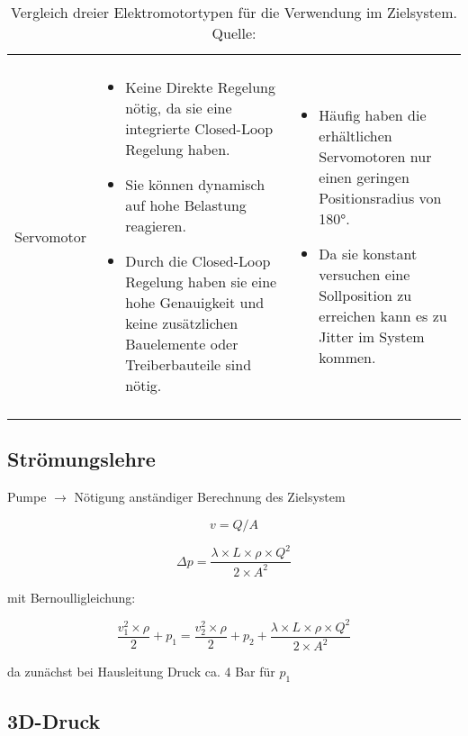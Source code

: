 \begin{longtable}{ p{}|p{}|p{} }
\begin{itemize}
    \end{itemize}
    \\
    Servomotor &
    \begin{itemize}
        \item Keine Direkte Regelung nötig, da sie eine integrierte Closed-Loop Regelung haben.
        \item Sie können dynamisch auf hohe Belastung reagieren.
        \item Durch die Closed-Loop Regelung haben sie eine hohe Genauigkeit und keine zusätzlichen Bauelemente oder Treiberbauteile sind nötig.
    \end{itemize}
    &
    \begin{itemize}
        \item Häufig haben die erhältlichen Servomotoren nur einen geringen Positionsradius von 180°.
        \item Da sie konstant versuchen eine Sollposition zu erreichen kann es zu Jitter im System kommen.
    \end{itemize}
    \\
    \caption{Vergleich dreier Elektromotortypen für die Verwendung im Zielsystem. Quelle: \cite{motors_seed}}
    \label{tab:el_motors}
\end{longtable}


\subsection{Strömungslehre}

Pumpe $\rightarrow$ Nötigung anständiger Berechnung des Zielsystem

\begin{equation} \label{v_qa}
    v = Q/A
\end{equation}

\begin{equation}\label{Rohreibung}
    \Delta p = \frac{\lambda \times L \times \rho \times Q^2}{2 \times A^2}
\end{equation}

mit Bernoulligleichung:

\begin{equation}
    \frac{v_{1}^2 \times \rho}{2} + p_1 = \frac{v_{2}^2 \times \rho}{2} + p_2 + \frac{\lambda \times L \times \rho \times Q^2}{2 \times A^2}
\end{equation}

da zunächst bei Hausleitung Druck ca. 4 Bar für $p_1$

\subsection{3D-Druck}

